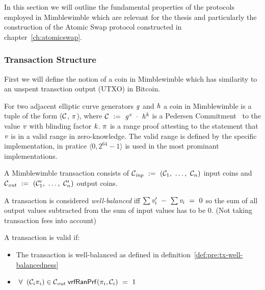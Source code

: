 In this section we will outline the fundamental properties of the protocols employed in Mimblewimble which are relevant for the thesis and particularly the construction of the Atomic Swap protocol constructed in chapter~\ref{ch:atomicswap}.
\subsubsection{Transaction Structure} \label{subsec:pre:mimblwimble-tx}

First we will define the notion of a coin in Mimblewimble which has similarity to an unspent transction output (UTXO) in Bitcoin.
\begin{definition}\label{def:pre:coin}
    For two adjacent elliptic curve generators $\mathit{g}$ and $\mathit{h}$ a coin in Mimblewimble is a tuple of the form ($\mathcal{C}$, $\pi$), where $\mathcal{C} ~:=~ \mathit{g}^{\mathit{v}} ~\cdot~ \mathit{h}^{\mathit{k}}$ is a Pedersen Commitment~\cite{pedersen1991non}
    to the value $\mathit{v}$ with blinding factor $\mathit{k}$. $\pi$ is a range proof attesting to the statement that $\mathit{v}$ is in a valid range in zero-knowledge.
    The valid range is defined by the specific implementation, in pratice $\langle 0, 2^{64} -1 \rangle$ is used in the most prominant implementations.
\end{definition}

A Mimblewimble transaction consists of $\mathcal{C}_{\mathit{inp}} ~:=~ (\mathcal{C}_1 ,~ \dots ,~ \mathcal{C}_n)$ input coins and $\mathcal{C}_{\mathit{out}} ~:=~ (\mathcal{C}'_1 ,~ \dots ,~ \mathcal{C}'_n)$ output coins.
\begin{definition}  \label{def:pre:tx-well-balancedness}
    A transaction is considered \emph{well-balanced} iff $\sum{\mathit{v}'_i} ~-~ \sum{\mathit{v}_i} ~=~ 0$ so the sum of all output values subtracted from the sum of input values has to be 0. (Not taking transaction fees into account)
\end{definition}

\begin{definition} \label{def:pre:tx-mw-validity}
    A transaction is valid if:
    \begin{itemize}
        \item The transaction is well-balanced as defined in definition~\ref{def:pre:tx-well-balancedness}
        \item $\;\forall\; \; (\mathcal{C}_i \pi_i) \in \mathcal{C}_{\mathit{out}} \; \mathsf{vrfRanPrf}(\pi_i,\mathcal{C}_i) ~=~ 1$
    \end{itemize}
\end{definition}

